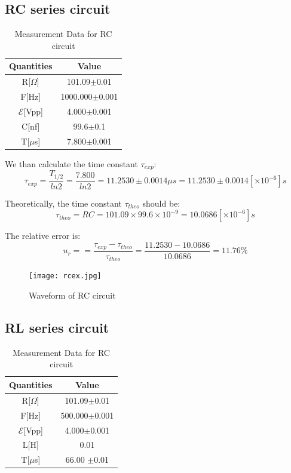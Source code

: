 \documentclass[12pt,a4paper]{article}
\begin{document}
\subsection{RC series circuit}
\begin{table}[H]
    \centering
    \begin{tabular}{|c|c|}
    \hline
    Quantities             & Value              \\ \hline
    R{[}$\Omega${]}        & 101.09$\pm$0.01    \\ \hline
    F{[}Hz{]}              & 1000.000$\pm$0.001 \\ \hline
    $\mathcal{E}${[}Vpp{]} & 4.000$\pm$0.001    \\ \hline
    C{[}nf{]}              & 99.6$\pm$0.1       \\ \hline
    T{[}$\mu$s{]}          & 7.800$\pm$0.001    \\ \hline
    \end{tabular}
    \caption{Measurement Data for RC circuit}
\end{table}
We than calculate the time constant $\tau_{exp}$:
$$\tau_{exp}=\frac{T_{1/2}}{ln2}=\frac{7.800}{ln2}=11.2530\pm0.0014\mu s=11.2530\pm0.0014 [\times 10^{-6}]s$$

Theoretically, the time constant ${\tau}_{theo}$ should be:
$${\tau}_{theo}=RC=101.09\times99.6\times 10^{-9}=10.0686[\times 10^{-6}]s$$

The relative error is:
$$u_r==\frac{\tau_{exp}-\tau_{theo}}{\tau_{theo}}=\frac{11.2530-10.0686}{10.0686}=11.76\%$$

\begin{figure}[H]
    \centering
    \texttt{[image: rcex.jpg]}
    \caption{Waveform of RC circuit}
\end{figure}

\subsection{RL series circuit}
\begin{table}[H]
    \centering
    \begin{tabular}{|c|c|}
    \hline
    Quantities             & Value              \\ \hline
    R{[}$\Omega${]}        & 101.09$\pm$0.01    \\ \hline
    F{[}Hz{]}              & 500.000$\pm$0.001 \\ \hline
    $\mathcal{E}${[}Vpp{]} & 4.000$\pm$0.001    \\ \hline
    L{[}H{]}              & 0.01       \\ \hline
    T{[}$\mu$s{]}          & 66.00 $\pm$0.01    \\ \hline
    \end{tabular}
    \caption{Measurement Data for RC circuit}
\end{table}
\end{document}
